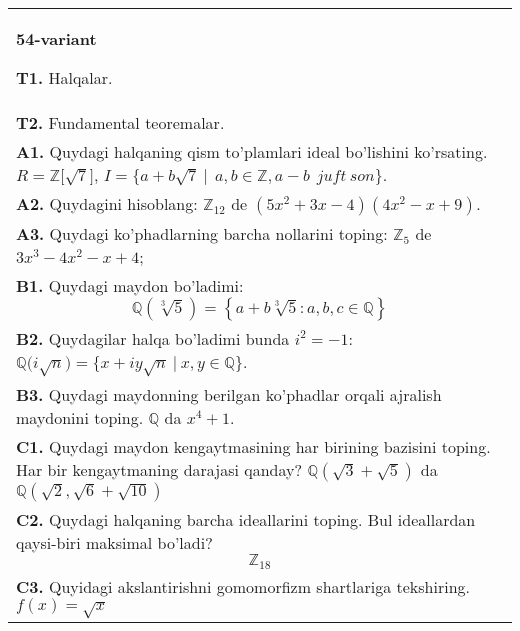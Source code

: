 \documentclass{article}
\begin{document}
\begin{tabular}{m{17cm}}
\textbf{54-variant}
\newline

\textbf{T1.} Halqalar. \\
\textbf{T2.} Fundamental teoremalar. \\
\textbf{A1.} Quydagi halqaning qism to'plamlari ideal bo'lishini ko'rsating.
\(R\mathbb{= Z\lbrack}\sqrt{7}\rbrack\), \(I = \{ a + b\sqrt{7}\ |\ \ a,b \in \mathbb{Z,}a - b\ \ juft\ son\}\). \\
\textbf{A2.} Quydagini hisoblang:
\(\mathbb{Z}_{12}\) de \(\left( 5x^{2} + 3x - 4 \right)\left( 4x^{2} - x + 9 \right)\). \\
\textbf{A3.} Quydagi ko'phadlarning barcha nollarini toping:
\(\mathbb{Z}_{5}\) de \(3x^{3} - 4x^{2} - x + 4\); \\
\textbf{B1.} Quydagi maydon bo'ladimi:
\[\mathbb{Q}\left( \sqrt[3]{5} \right) = \left\{ a + b\sqrt[3]{5}:a,b,c \in \mathbb{Q} \right\}\] \\
\textbf{B2.} Quydagilar halqa bo'ladimi bunda \(i^{2} = - 1\):
\(\mathbb{Q(}i\sqrt{n}) = \{ x + iy\sqrt{n}\ |\ x,y \in \mathbb{Q\}}\). \\
\textbf{B3.} Quydagi maydonning berilgan ko'phadlar orqali ajralish maydonini toping.
\(\mathbb{Q}\) da \(x^{4} + 1\). \\
\textbf{C1.} Quydagi maydon kengaytmasining har birining bazisini toping. Har bir kengaytmaning darajasi qanday?
\(\mathbb{Q}\left( \sqrt{3} + \sqrt{5} \right)\) da \(\mathbb{Q}\left( \sqrt{2},\sqrt{6} + \sqrt{10} \right)\) \\
\textbf{C2.} Quydagi halqaning barcha ideallarini toping. Bul ideallardan qaysi-biri maksimal bo'ladi?
\[\mathbb{Z}_{18}\] \\
\textbf{C3.} Quyidagi akslantirishni gomomorfizm shartlariga tekshiring. \(f(x) = \sqrt{x}\) \\

\end{tabular}
\vspace{1cm}
\end{document}
